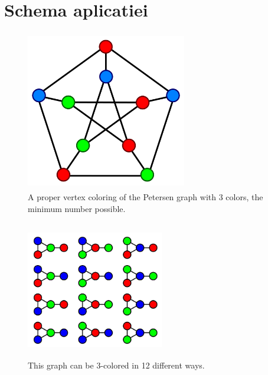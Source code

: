 \documentclass[12pt]{article}
\begin{document}
\section{Schema aplicatiei}
\begin{figure}[ht!]
\centering
\includegraphics[width=70mm,height=70mm]{graf.png}
\caption{A proper vertex coloring of the Petersen graph with 3 colors, the minimum number possible. \label{overflow}}
\end{figure}

\begin{figure}[ht!]
\centering
\includegraphics[width=60mm,height=60mm]{graf1.png}
\caption{This graph can be 3-colored in 12 different ways.
 \label{overflow}}
\end{figure}
\end{document}
